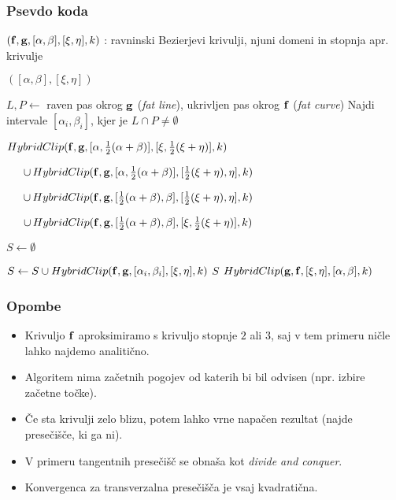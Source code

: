 \documentclass[unknownkeysallowed]{beamer}
\begin{document}
\begin{frame}
\frametitle{Psevdo koda}

\begin{scriptsize}
   \begin{algorithmic}[1]
	\Require $({\bf f},{\bf g}, [\alpha,\beta], [\xi,\eta], k)$ : ravninski Bezierjevi krivulji, njuni domeni in stopnja apr. krivulje

		\State \Return $([\alpha,\beta],[\xi,\eta])$
	\Else
		
		\If{$|\alpha - \beta | \geq |\xi - \eta|$}
			\State $L, P \gets $ raven pas okrog ${\bf g}$ ({\em fat line}), ukrivljen pas okrog ${\bf f}$ ({\em fat curve})
			\State Najdi intervale $[\alpha _i,\beta _i]$, kjer je $L\cap P\neq \emptyset$
				\State \Return \begin{varwidth}[t]{\linewidth} 
					$HybridClip({\bf f},{\bf g},[\alpha,\frac{1}{2}(\alpha+\beta)],[\xi,\frac{1}{2}(\xi+\eta)],k)$\par$
        \hskip\algorithmicindent
					\cup \, HybridClip({\bf f},{\bf g},[\alpha,\frac{1}{2}(\alpha+\beta)],[\frac{1}{2}(\xi+\eta), \eta],k)$\par$
        \hskip\algorithmicindent
					\cup \, HybridClip({\bf f},{\bf g},[\frac{1}{2}(\alpha+\beta), \beta],[\frac{1}{2}(\xi+\eta), \eta],k)$\par$
        \hskip\algorithmicindent
					\cup \, HybridClip({\bf f},{\bf g},[\frac{1}{2}(\alpha+\beta), \beta],[\xi, \frac{1}{2}(\xi+\eta)],k)$
					\end{varwidth}
			\Else
				\State $S\gets \emptyset$

					\State $S\gets S\cup HybridClip({\bf f},{\bf g},[\alpha _i,\beta _i], [\xi,\eta],k)$
				\EndFor
				\State \Return $S$
			\EndIf
		\Else
			\State $HybridClip( {\bf g}, {\bf f}, [\xi,\eta],[\alpha,\beta],k)$
		\EndIf
	\EndIf

   \end{algorithmic}
\end{scriptsize}

\end{frame}


\begin{frame}
\frametitle{Opombe}
\begin{itemize}
\item Krivuljo ${\bf f}$ aproksimiramo s krivuljo stopnje $2$ ali $3$, saj v tem primeru ničle lahko najdemo analitično.
\medskip
\item Algoritem nima začetnih pogojev od katerih bi bil odvisen (npr. izbire začetne točke).
\medskip
\item Če sta krivulji zelo blizu, potem lahko vrne napačen rezultat (najde presečišče, ki ga ni).
\medskip
\item V primeru tangentnih presečišč se obnaša kot {\em divide and conquer}.
\medskip
\item Konvergenca za transverzalna presečišča je vsaj kvadratična.
\end{itemize}
\end{frame}
\end{document}
